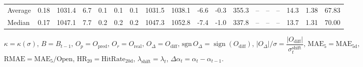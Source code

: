 \begin{threeparttable}
{\begin{tabular}{lrrrrrrrrrrrrrrrrr}
Average &     0.18 & 1031.4 &               6.7 &               0.1 &                0.1 &                0.1 & 1031.5 & 1038.1 &       -6.6 &                     -0.3 &               355.3 &         -- &        -- &             -- &             14.3 &            1.38 &                  67.83 \\
 Median &     0.17 & 1047.1 &               7.7 &               0.2 &                0.2 &                0.2 & 1047.3 & 1052.8 &       -7.4 &                     -1.0 &               337.8 &         -- &        -- &             -- &             13.7 &            1.31 &                  70.00 \\
\bottomrule
\end{tabular}
}
\begin{tablenotes}\footnotesize
\item $\kappa=\kappa(\sigma)$, $B=B_{t-1}$, $O_p=O_{\text{pred}}$, $O_r=O_{\text{real}}$, $O_\Delta=O_{\text{diff}}$, $\mathrm{sgn}\,O_\Delta=\operatorname{sign}(O_{\text{diff}})$, $|O_\Delta|/\sigma=\dfrac{|O_{\text{diff}}|}{\sigma_t^{\text{shift}}}$, $\mathrm{MAE}_5=\mathrm{MAE}_{5\text{d}}$, $\mathrm{RMAE}= \mathrm{MAE}_5 / \text{Open}$, $\mathrm{HR}_{20}=\mathrm{HitRate}_{20\text{d}}$, 
$\lambda_{\text{shift}}=\lambda_t$, 
$\Delta\alpha_t=\alpha_t-\alpha_{t-1}$.
\end{tablenotes}
\end{threeparttable}
\endgroup

